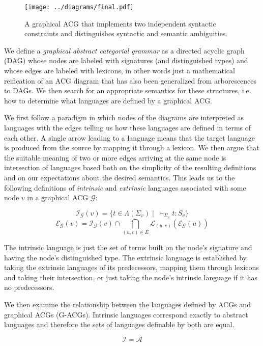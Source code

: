 \documentclass[twocolumn]{article}
\begin{document}
\begin{figure}
  \centering
  \texttt{[image: ../diagrams/final.pdf]}
  \caption{{\label{fig:gacg} A graphical ACG that implements two
      independent syntactic constraints and distinguishes syntactic and
      semantic ambiguities.}}
\end{figure}

We define a \emph{graphical abstract categorial grammar} as a directed
acyclic graph (DAG) whose nodes are labeled with signatures (and
distinguished types) and whose edges are labeled with lexicons, in other
words just a mathematical reification of an ACG diagram that has also
been generalized from arborescences to DAGs. We then search for an
appropriate semantics for these structures, i.e. how to determine what
languages are defined by a graphical ACG.

We first follow a paradigm in which nodes of the diagrams are
interpreted as languages with the edges telling us how these languages
are defined in terms of each other. A single arrow leading to a language
means that the target language is produced from the source by mapping it
through a lexicon. We then argue that the suitable meaning of two or
more edges arriving at the same node is intersection of languages based
both on the simplicity of the resulting definitions and on our
expectations about the desired semantics. This leads us to the following
definitions of \emph{intrinsic} and \emph{extrinsic} languages
associated with some node $v$ in a graphical ACG $\mathcal{G}$:

$$
\mathcal{I}_{\mathcal{G}}(v) = \{t \in \Lambda(\Sigma_v)
\mid\ \vdash_{\Sigma_v} t : S_v\}
$$
$$
\mathcal{E}_{\mathcal{G}}(v) = \mathcal{I}_{\mathcal{G}}(v) \cap
\bigcap_{(u,v) \in E} \mathcal{L}_{(u,v)}(\mathcal{E}_{\mathcal{G}}(u))
$$

The intrinsic language is just the set of terms built on the node's
signature and having the node's distinguished type. The extrinsic
language is established by taking the extrinsic languages of its
predecessors, mapping them through lexicons and taking their
intersection, or just taking the node's intrinsic language if it has no
predecessors.

We then examine the relationship between the languages defined by ACGs
and graphical ACGs (G-ACGs). Intrinsic languages correspond exactly to
abstract languages and therefore the sets of languages definable by both
are equal.

$$
\mathcal{I} = \mathcal{A}
$$
\end{document}

